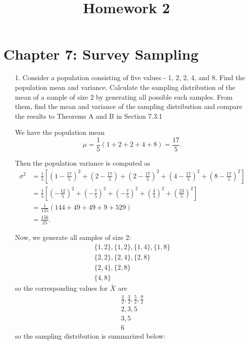 \documentclass{article}
\begin{document}
\title{Homework 2}
\maketitle
\thispagestyle{fancy}

\section*{Chapter 7: Survey Sampling}

\begin{itemize}
	\item[1.] Consider a population consisting of five values - 1, 2, 2, 4, and 8. Find the population mean and variance. Calculate the sampling distribution of the mean of a sample of size 2 by generating all possible such samples. From them, find the mean and variance of the sampling distribution and compare the results to Theorems A and B in Section 7.3.1
		\begin{soln}
			We have the population mean \[\mu=\frac{1}{5}(1+2+2+4+8)=\boxed{\frac{17}{5}}.\]
			
			Then the population variance is computed as 
			\begin{align*}
				\sigma^2 &= \frac{1}{5}\left[ \left( 1-\frac{17}{5} \right)^2+\left( 2-\frac{17}{5} \right) + \left( 2-\frac{17}{5} \right)^2+\left(4-\frac{17}{5}\right)^2 +\left( 8-\frac{17}{5} \right)^2 \right] \\
				&= \frac{1}{5} \left[ \left( -\frac{12}{5} \right)^2+\left( -\frac{7}{5} \right)^2+\left( -\frac{7}{5} \right)^2 + \left( \frac{3}{5} \right)^2+\left( \frac{23}{5} \right)^2 \right] \\
				&= \frac{1}{125}(144+49+49+9+529) \\
				&= \boxed{\frac{156}{25}}.
			\end{align*}

			Now, we generate all samples of size 2:
			\begin{align*}
				\{1, 2\}, \{1, 2\}, \{1, 4\}, \{1, 8\} \\
				\{2, 2\}, \{2, 4\}, \{2, 8\} \\
				\{2, 4\}, \{2, 8\} \\
				\{4, 8\}
			\end{align*} so the corresponding values for $\bar{X}$ are 
			\begin{align*}
				\frac{3}{2}, \frac{3}{2}, \frac{5}{2}, \frac{9}{2} \\
				2, 3, 5 \\
				3, 5 \\
				6
			\end{align*} so the sampling distribution is summarized below:


\end{soln}
\end{itemize}
\end{document}

